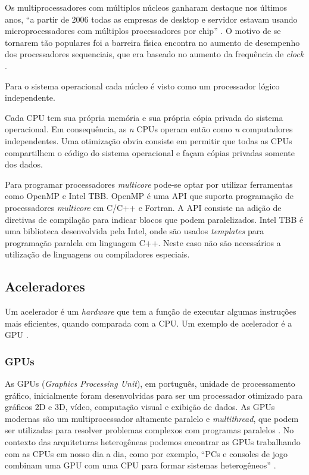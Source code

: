Os multiprocessadores com múltiplos núcleos ganharam destaque nos últimos anos, “a partir de 2006 todas as empresas de desktop e servidor estavam usando microprocessadores com múltiplos processadores por chip” \cite[p.~31]{hennessy2014organizaccao}.
O motivo de se tornarem tão populares foi a barreira física encontra no aumento de desempenho dos processadores sequenciais, que era baseado no aumento da frequência de \textit{clock} \cite{hennessy2014organizaccao}.

Para o sistema operacional cada núcleo é visto como um processador lógico independente.

\begin{citacao}
Cada CPU tem sua própria memória e sua própria cópia privada do sistema operacional.
Em consequência, as \emph{n} CPUs operam então como \emph{n} computadores independentes.
Uma otimização obvia consiste em permitir que todas as CPUs compartilhem o código do sistema operacional e façam cópias privadas somente dos dados. \cite[p.~331]{tanenbaum20103a}
\end{citacao}

Para programar processadores \textit{multicore} pode-se optar por utilizar ferramentas como OpenMP e Intel TBB.
OpenMP é uma API que suporta programação de processadores \textit{multicore} em C/C++ e Fortran.
A API consiste na adição de diretivas de compilação para indicar blocos que podem paralelizados.
Intel TBB é uma biblioteca desenvolvida pela Intel, onde são usados \textit{templates} para programação paralela em linguagem C++.
Neste caso não são necessários a utilização de linguagens ou compiladores especiais.

\subsection{Aceleradores}
Um acelerador é um \textit{hardware} que tem a função de executar algumas instruções mais eficientes,
quando comparada com a CPU. Um exemplo de acelerador é a GPU \cite{kindratenko2010high}.

\subsubsection{GPUs}
As GPUs (\textit{Graphics Processing Unit}), em português, unidade de processamento gráfico, inicialmente foram desenvolvidas para ser um processador otimizado para gráficos 2D e 3D, vídeo,
computação visual e exibição de dados.
As GPUs modernas são um multiprocessador altamente paralelo e \textit{multithread}, que podem ser utilizadas para resolver problemas complexos com programas paralelos \cite{hennessy2014organizaccao}.
No contexto das arquiteturas heterogêneas podemos encontrar as GPUs trabalhando com as CPUs em nosso dia a dia, como por exemplo,
“PCs e consoles de jogo combinam uma GPU com uma CPU para formar sistemas heterogêneos” \cite[p.~A-569]{hennessy2014organizaccao}.

